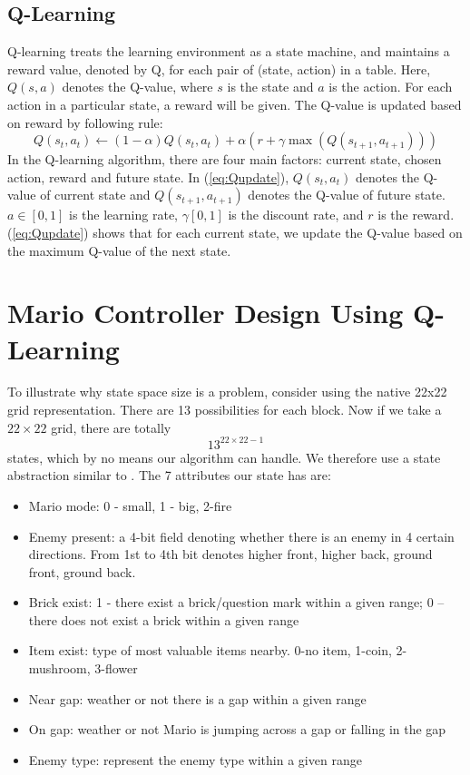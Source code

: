 \subsection{Q-Learning}
Q-learning treats the learning environment as a state machine, and maintains a reward value, denoted by Q, for each pair of (state, action) in a table. Here, $Q(s,a)$ denotes the Q-value, where $s$ is the state and $a$ is the action. For each action in a particular state, a reward will be given. The Q-value is updated based on reward by following rule:
\begin{equation}
\label{eq:Qupdate}
Q(s_t,a_t) \leftarrow (1-\alpha)Q(s_t,a_t) + \alpha(r+\gamma\max(Q(s_{t+1},a_{t+1})))
\end{equation}
In the Q-learning algorithm, there are four main factors: current state, chosen action, reward and future state. In (\ref{eq:Qupdate}), $Q(s_t,a_t)$ denotes the Q-value of current state and $Q(s_{t+1},a_{t+1})$ denotes the Q-value of future state. $a \in \left[0,1\right]$ is the learning rate, $\gamma \left[0,1\right]$ is the discount rate, and $r$ is the reward. (\ref{eq:Qupdate}) shows that for each current state, we update the Q-value based on the maximum Q-value of the next state.

\section{Mario Controller Design Using Q-Learning}
To illustrate why state space size is a problem, consider using the native 22x22 grid representation. There are 13 possibilities for each block. Now if we take a $22\times 22$ grid, there are totally
\begin{equation}
13^{22\times 22 - 1}
\end{equation}
states, which by no means our algorithm can handle. We therefore use a state abstraction similar to \cite{tsay2011evolving}. The 7 attributes our state has are:

\begin{itemize}
\item Mario mode: 0 - small, 1 - big, 2-fire
\item Enemy present: a 4-bit field denoting whether there is an enemy in 4 certain directions. From 1st to 4th bit denotes higher front, higher back, ground front, ground back.
\item Brick exist: 1 - there exist a brick/question mark within a given range; 0 -- there does not exist a brick within a given range
\item Item exist: type of most valuable items nearby. 0-no item, 1-coin, 2-mushroom, 3-flower
\item Near gap: weather or not there is a gap within a given range
\item On gap: weather or not Mario is jumping across a gap or falling in the gap
\item Enemy type: represent the enemy type within a given range
\end{itemize}

